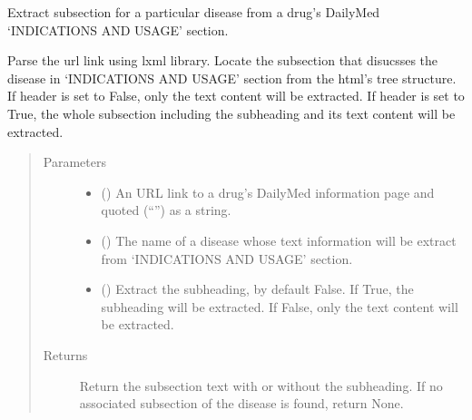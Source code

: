 \documentclass[letterpaper,10pt,english]{sphinxmanual}
\begin{document}
\begin{fulllineitems}
\label{\detokenize{biomarker_extraction:biomarker_extraction.disease_content}}
\sphinxAtStartPar
Extract subsection for a particular disease from a drug’s DailyMed ‘INDICATIONS AND USAGE’ section.

\sphinxAtStartPar
Parse the url link using lxml library. Locate the subsection that disucsses the disease in ‘INDICATIONS AND USAGE’ section from the html’s tree structure.
If header is set to False, only the text content will be extracted. If header is set to True, the whole subsection including the subheading and its text content will be extracted.
\begin{quote}\begin{description}
\item[{Parameters}] \leavevmode\begin{itemize}
\item {} 
\sphinxAtStartPar
{} () \textendash{} An URL link to a drug’s DailyMed information page and quoted (“”) as a string.

\item {} 
\sphinxAtStartPar
{} () \textendash{} The name of a disease whose text information will be extract from ‘INDICATIONS AND USAGE’ section.

\item {} 
\sphinxAtStartPar
{} (\sphinxstyleliteralemphasis{\sphinxupquote{, }}) \textendash{} Extract the subheading, by default False.
If True, the subheading will be extracted.
If False, only the text content will be extracted.

\end{itemize}

\item[{Returns}] \leavevmode
\sphinxAtStartPar
Return the subsection text with or without the subheading.
If no associated subsection of the disease is found, return None.


\end{description}
\end{quote}
\end{fulllineitems}
\end{document}
